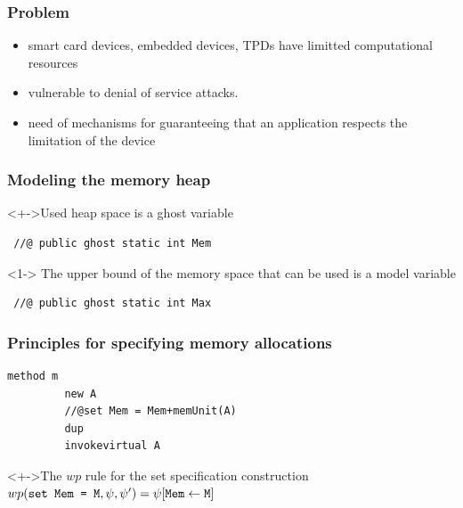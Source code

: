 \documentclass{beamer}
\begin{document}
\begin{frame} \frametitle{Problem}

     \begin{itemize} 
        \item smart card devices, embedded devices, TPDs have limitted computational resources
	  \item vulnerable to denial of service attacks. 
	    \item need of mechanisms for guaranteeing that an application 
	      respects the limitation of the device
   \end{itemize}
\end{frame}

\begin{frame}[containsverbatim] \frametitle{Modeling the memory heap}  
  \begin{block}<+->{Used heap space is a ghost variable}
    \begin{verbatim} //@ public ghost static int Mem \end{verbatim}
  \end{block}
  

  \begin{block}<1->{ The upper bound of the memory space that can be used is a model variable}
    \begin{verbatim} //@ public ghost static int Max \end{verbatim}   
  \end{block}
\end{frame}


\begin{frame} \frametitle{Principles for specifying memory allocations}
  \begin{Example} {
    \begin{lstlisting}[language=jvmis]
      method m
         new A
         //@set Mem = Mem+memUnit(A)
         dup
         invokevirtual A
    \end{lstlisting}
 }   
  \end{Example} 
  
  \begin{block}<+->{The $wp$ rule for the set specification construction }
     $wp(\verb!set Mem = M! , \psi , \psi') = \psi[\verb!Mem! \leftarrow \verb!M!] $
  \end{block}
\end{frame}
\end{document}
